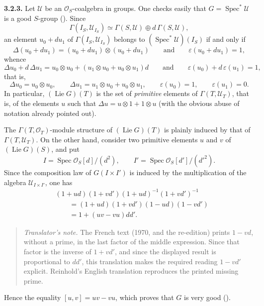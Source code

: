\medskip
\noindent\textbf{3.2.3.}
\label{sga3:VIIA:3.2.3}
Let \(\mathcal U\) be an \(\mathcal O_S\)-coalgebra in groups. One
checks easily that \(G=\operatorname{Spec}^{*}\mathcal U\) is a good
\(S\)-group (). Since
\[
  \Gamma(I_S,\mathcal U_{I_S})\simeq
  \Gamma(S,\mathcal U)\oplus d\,\Gamma(S,\mathcal U),
\]
an element \(u_0+du_1\) of \(\Gamma(I_S,\mathcal U_{I_S})\) belongs to
\((\operatorname{Spec}^{*}\mathcal U)(I_S)\) if and only if
\[
  \Delta(u_0+du_1)=(u_0+du_1)\otimes(u_0+du_1)
  \qquad\text{and}\qquad
  \varepsilon(u_0+du_1)=1,
\]
whence
\[
  \Delta u_0+d\,\Delta u_1
  =u_0\otimes u_0+(u_1\otimes u_0+u_0\otimes u_1)d
  \qquad\text{and}\qquad
  \varepsilon(u_0)+d\,\varepsilon(u_1)=1,
\]
that is,
\[
  \Delta u_0=u_0\otimes u_0,\qquad
  \Delta u_1=u_1\otimes u_0+u_0\otimes u_1,\qquad
  \varepsilon(u_0)=1,\qquad
  \varepsilon(u_1)=0.
\]
In particular, \((\operatorname{Lie}G)(T)\) is the set of
\emph{primitive} elements of \(\Gamma(T,\mathcal U_T)\), that is, of the
elements \(u\) such that \(\Delta u=u\otimes1+1\otimes u\) (with the
obvious abuse of notation already pointed out).

The \(\Gamma(T,\mathcal O_T)\)-module structure of
\((\operatorname{Lie}G)(T)\) is plainly induced by that of
\(\Gamma(T,\mathcal U_T)\). On the other hand, consider two primitive
elements \(u\) and \(v\) of \((\operatorname{Lie}G)(S)\), and put
\[
  I=\operatorname{Spec}\mathcal O_S[d]/(d^2),
  \qquad
  I'=\operatorname{Spec}\mathcal O_S[d']/(d'^2).
\]
Since the composition law of \(G(I\times I')\) is induced by the
multiplication of the algebra \(\mathcal U_{I\times I'}\), one has
\[
  \begin{aligned}
  &(1+ud)(1+vd')(1+ud)^{-1}(1+vd')^{-1}\\
  &\qquad
    =(1+ud)(1+vd')(1-ud)(1-vd')\\
  &\qquad
    =1+(uv-vu)dd'.
  \end{aligned}
\]
\begin{quote}
\small
{}
\label{sga3:VIIA:3.2.3-source-note-missing-prime}
\emph{Translator's note.} The French text (1970, and the re-edition) prints \(1-vd\), without a prime,
in the last factor of the middle expression. Since that factor is
the inverse of \(1+vd'\), and since the displayed result is
proportional to \(dd'\), this translation makes the required reading \(1-vd'\) explicit. Reinhold's English translation reproduces the printed missing prime.
\end{quote}
Hence the equality \([u,v]=uv-vu\), which proves that \(G\) is very good
().

